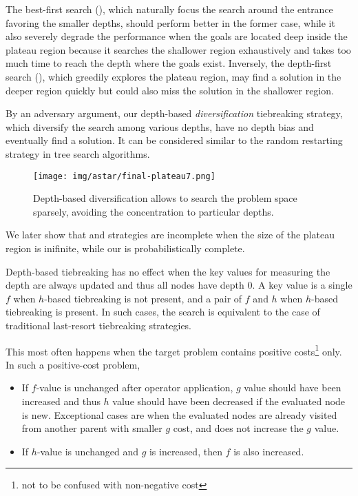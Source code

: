 


The best-first search (\fifo), which naturally focus the search around
the entrance favoring the smaller depths, should perform better in the
former case, while it also severely degrade the performance when the
goals are located deep inside the plateau region because it searches the
shallower region exhaustively and takes too much time to reach the depth
where the goals exist.
Inversely, the depth-first search (\lifo), which greedily explores the
plateau region, may find a solution in the deeper region quickly but
could also miss the solution in the shallower region.

By an adversary argument, our depth-based \emph{diversification}
tiebreaking strategy, which diversify the search among various depths,
have no depth bias and eventually find a solution. It can be considered
similar to the random restarting strategy in tree search algorithms.

\begin{figure}[htbp]
 \texttt{[image: img/astar/final-plateau7.png]}
 \caption{Depth-based diversification allows to search the problem space
 sparsely, avoiding the concentration to particular depths.}
 \label{fig:plateau-depiction-all-optimal}
\end{figure}


We later show that
\fifo and \lifo strategies are incomplete when the size of the plateau
region is inifinite, while our \id is probabilistically complete.

Depth-based tiebreaking has no effect when the key values for measuring
the depth are always updated and thus all nodes have depth 0. A key
value is a single $f$ when $h$-based tiebreaking is not present, and a
pair of $f$ and $h$ when $h$-based tiebreaking is present.  In such
cases, the search is equivalent to the case of traditional last-resort
tiebreaking strategies.

This most often happens when the target problem contains
positive costs\footnote{not to be confused with non-negative cost} only.
In such a positive-cost problem,
\begin{itemize}
 \item If $f$-value is unchanged after operator application, $g$ value
       should have been increased and thus $h$ value should have been
       decreased if the evaluated node is new. Exceptional cases are
       when the evaluated nodes are already visited from another parent
       with smaller $g$ cost, and does not increase the $g$ value.
 \item If $h$-value is unchanged and $g$ is increased, then $f$ is also increased.
\end{itemize}

